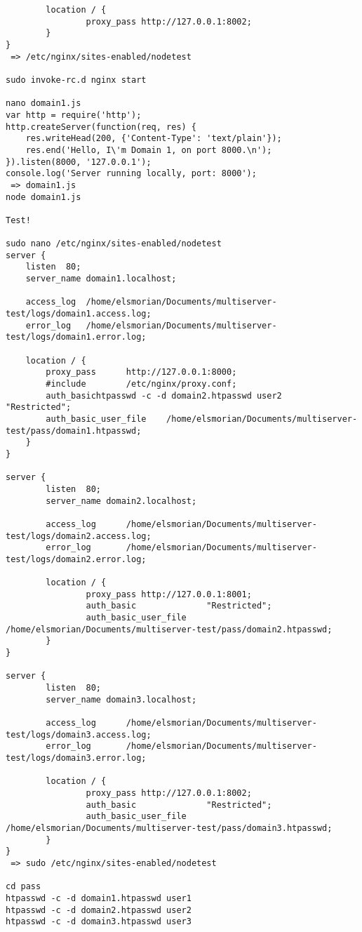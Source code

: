 \documentclass[A4paper,11pt]{article}
\begin{document}
\begin{lstlisting}
        location / {
                proxy_pass http://127.0.0.1:8002;
        }
}
 => /etc/nginx/sites-enabled/nodetest

sudo invoke-rc.d nginx start

nano domain1.js
var http = require('http');
http.createServer(function(req, res) {
	res.writeHead(200, {'Content-Type': 'text/plain'});
	res.end('Hello, I\'m Domain 1, on port 8000.\n');
}).listen(8000, '127.0.0.1');
console.log('Server running locally, port: 8000');
 => domain1.js
node domain1.js

Test!

sudo nano /etc/nginx/sites-enabled/nodetest
server {
	listen	80;
	server_name domain1.localhost;

	access_log 	/home/elsmorian/Documents/multiserver-test/logs/domain1.access.log;
	error_log	/home/elsmorian/Documents/multiserver-test/logs/domain1.error.log;
	
	location / {
		proxy_pass 		http://127.0.0.1:8000;
		#include 		/etc/nginx/proxy.conf;
		auth_basichtpasswd -c -d domain2.htpasswd user2		"Restricted";
		auth_basic_user_file	/home/elsmorian/Documents/multiserver-test/pass/domain1.htpasswd;
	}
}

server {
        listen  80;
        server_name domain2.localhost;

        access_log      /home/elsmorian/Documents/multiserver-test/logs/domain2.access.log;
        error_log       /home/elsmorian/Documents/multiserver-test/logs/domain2.error.log;

        location / {
                proxy_pass http://127.0.0.1:8001;
                auth_basic              "Restricted";
                auth_basic_user_file    /home/elsmorian/Documents/multiserver-test/pass/domain2.htpasswd;
        }
}

server {
        listen  80;
        server_name domain3.localhost;

        access_log      /home/elsmorian/Documents/multiserver-test/logs/domain3.access.log;
        error_log       /home/elsmorian/Documents/multiserver-test/logs/domain3.error.log;

        location / {
                proxy_pass http://127.0.0.1:8002;
                auth_basic              "Restricted";
                auth_basic_user_file    /home/elsmorian/Documents/multiserver-test/pass/domain3.htpasswd;
        }
}
 => sudo /etc/nginx/sites-enabled/nodetest

cd pass
htpasswd -c -d domain1.htpasswd user1
htpasswd -c -d domain2.htpasswd user2
htpasswd -c -d domain3.htpasswd user3


\end{lstlisting}
\end{document}
